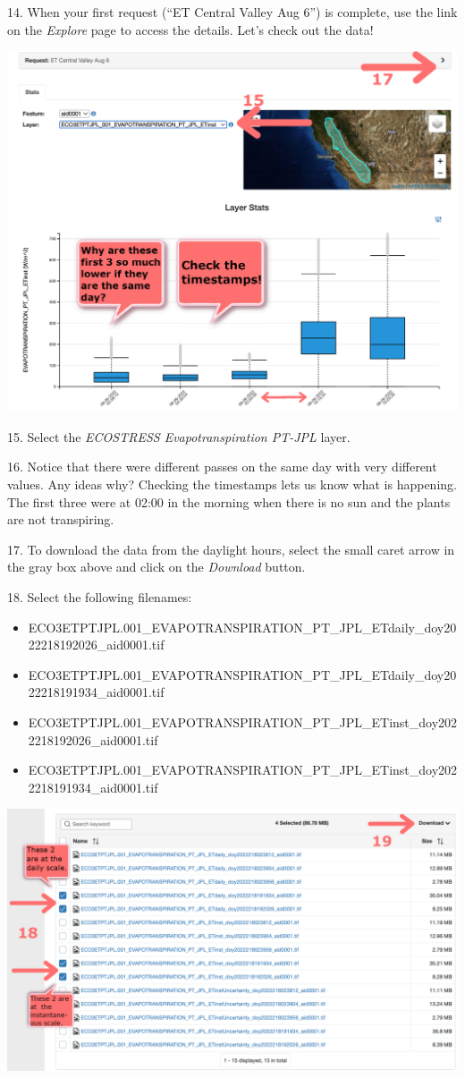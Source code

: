 \documentclass[oneside,a4paper,11pt,explicit]{book}
\begin{document}
14. When your first request (``ET Central Valley Aug 6'') is complete, use the link on the \textit{Explore} page to access the details. Let's check out the data!

\vspace{.5em}

\centerline{\includegraphics[width=.6\textwidth]{ETinstDataCheck.png}}

\vspace{.5em}

15. Select the \textit{ECOSTRESS Evapotranspiration PT-JPL} layer.

16. Notice that there were different passes on the same day with very different values. Any ideas why? Checking the timestamps lets us know what is happening. The first three were at 02:00 in the morning when there is no sun and the plants are not transpiring.

17. To download the data from the daylight hours, select the small caret arrow in the gray box above and click on the \textit{Download} button.

18. Select the following filenames:

\begin{itemize}
	\item ECO3ETPTJPL.001\_EVAPOTRANSPIRATION\_PT\_JPL\_ETdaily\_doy2022218192026\_aid0001.tif
	\item ECO3ETPTJPL.001\_EVAPOTRANSPIRATION\_PT\_JPL\_ETdaily\_doy2022218191934\_aid0001.tif
	\item ECO3ETPTJPL.001\_EVAPOTRANSPIRATION\_PT\_JPL\_ETinst\_doy2022218192026\_aid0001.tif
	\item ECO3ETPTJPL.001\_EVAPOTRANSPIRATION\_PT\_JPL\_ETinst\_doy2022218191934\_aid0001.tif
\end{itemize}

\vspace{.5em}

\centerline{\includegraphics[width=.8\textwidth]{ETdownload.png}}
\end{document}
